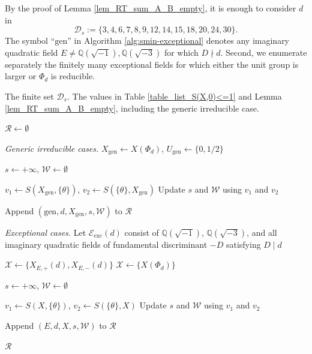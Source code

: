 \documentclass[11pt]{amsart}
\theoremstyle{plain}
\theoremstyle{definition}
\numberwithin{equation}{section}
\newcommand{\bbQ}{\mathbb{Q}}
\begin{document}
By the proof of Lemma \ref{lem_RT_sum_A_B_empty}, it is enough to
consider $d$ in
\[
\mathcal D_s
:=
\{3,4,6,7,8,9,12,14,15,18,20,24,30\}.
\]
The symbol ``$\mathrm{gen}$'' in Algorithm
\ref{alg:smin-exceptional} denotes any imaginary quadratic field
$E\neq\bbQ(\sqrt{-1}),\bbQ(\sqrt{-3})$ for which $D\nmid d$.
Second, we enumerate separately the finitely many exceptional fields for which either the unit group is larger or $\Phi_d$ is reducible.

\begin{algorithm}[H]
\caption{Exceptional values of $s_{\min}(f,E)$}
\label{alg:smin-exceptional}
\begin{algorithmic}[1]
\Require The finite set $\mathcal D_s$.
\Ensure The values in Table
\ref{table_list_S(X,0)<=1} and Lemma
\ref{lem_RT_sum_A_B_empty}, including the generic irreducible case.

\State $\mathcal R\gets\emptyset$


  \Statex \textit{Generic irreducible cases.}
  \State
  $X_{\mathrm{gen}}\gets X(\Phi_d)$,
  $U_{\mathrm{gen}}\gets\{0,1/2\}$

    \State
    $s\gets+\infty$, $\mathcal W\gets\emptyset$

      \State
      $v_1\gets S(X_{\mathrm{gen}},\{\theta\})$,
      $v_2\gets S(\{\theta\},X_{\mathrm{gen}})$
      \State Update $s$ and $\mathcal W$ using $v_1$ and $v_2$
    \EndFor

    \State Append
    $(\mathrm{gen},d,X_{\mathrm{gen}},s,\mathcal W)$
    to $\mathcal R$
  \EndIf

  \Statex \textit{Exceptional cases.}
  \State Let $\mathcal E_{\mathrm{exc}}(d)$ consist of
  $\bbQ(\sqrt{-1})$, $\bbQ(\sqrt{-3})$, and all imaginary quadratic
  fields of fundamental discriminant $-D$ satisfying $D\mid d$


      \State
      $\mathcal X\gets\{X_{E,+}(d),X_{E,-}(d)\}$
    \Else
      \State
      $\mathcal X\gets\{X(\Phi_d)\}$
    \EndIf


        \State
        $s\gets+\infty$, $\mathcal W\gets\emptyset$

          \State
          $v_1\gets S(X,\{\theta\})$,
          $v_2\gets S(\{\theta\},X)$
          \State Update $s$ and $\mathcal W$ using $v_1$ and $v_2$
        \EndFor

        \State Append $(E,d,X,s,\mathcal W)$ to $\mathcal R$
      \EndIf

    \EndFor
  \EndFor
\EndFor

\State \Return $\mathcal R$
\end{algorithmic}
\end{algorithm}
\end{document}
